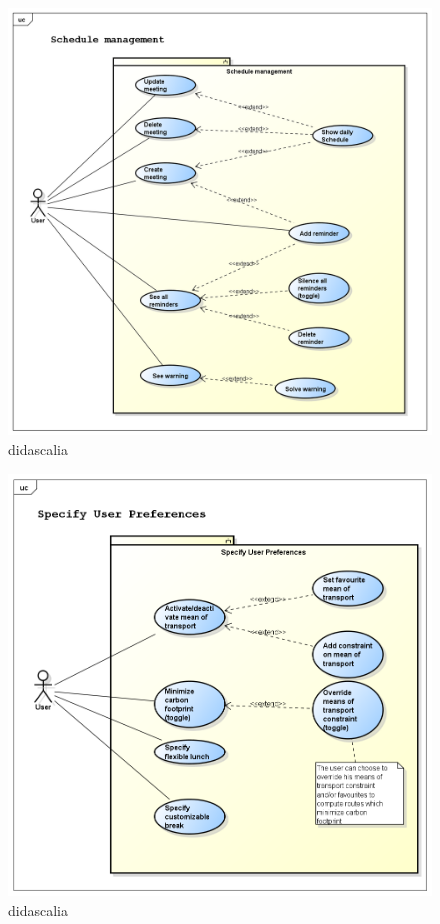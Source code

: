 \documentclass [b5paper,12pt,openany]{book}
\begin{document}
\begin{figure} 
\includegraphics[width=\textwidth]{../usecases/png/schedulemanagement} 
\caption{didascalia} 
\label{fig:schedulemanagement} 
\end{figure}

\newpage

\newpage

\newpage


\begin{figure} 
\includegraphics[width=\textwidth]{../usecases/png/specifyuserpreferences} 
\caption{didascalia} 
\label{fig:specifyuserpreferences} 
\end{figure}

\newpage

\end{document}

